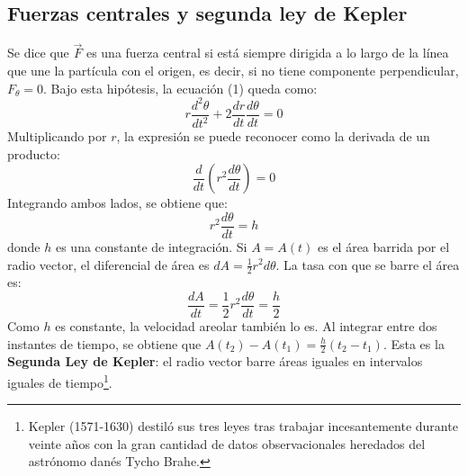 \subsection{Fuerzas centrales y segunda ley de Kepler}
Se dice que $\vec{F}$ es una fuerza central si está siempre dirigida a lo largo de la línea que une la partícula con el origen, es decir, si no tiene componente perpendicular, $F_\theta=0$. Bajo esta hipótesis, la ecuación (1) queda como:
\[ r\frac{d^2\theta}{dt^2} + 2\frac{dr}{dt}\frac{d\theta}{dt} = 0 \]
Multiplicando por $r$, la expresión se puede reconocer como la derivada de un producto:
\[ \frac{d}{dt}\left(r^2\frac{d\theta}{dt}\right) = 0 \]
Integrando ambos lados, se obtiene que:
\begin{equation} r^2 \frac{d\theta}{dt} = h \tag{3} \end{equation}
donde $h$ es una constante de integración. Si $A=A(t)$ es el área barrida por el radio vector, el diferencial de área es $dA = \frac{1}{2}r^2d\theta$. La tasa con que se barre el área es:
\[ \frac{dA}{dt} = \frac{1}{2}r^2\frac{d\theta}{dt} = \frac{h}{2} \]
Como $h$ es constante, la velocidad areolar también lo es. Al integrar entre dos instantes de tiempo, se obtiene que $A(t_2) - A(t_1) = \frac{h}{2}(t_2-t_1)$. Esta es la \textbf{Segunda Ley de Kepler}: el radio vector barre áreas iguales en intervalos iguales de tiempo\footnote{Kepler (1571-1630) destiló sus tres leyes tras trabajar incesantemente durante veinte años con la gran cantidad de datos observacionales heredados del astrónomo danés Tycho Brahe.}.

